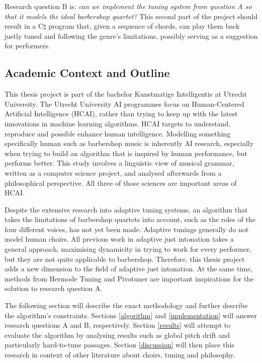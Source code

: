 \documentclass[a4paper]{article}
\begin{document}
Research question B is: {\it can we implement the tuning system from question A so that it models the ideal barbershop quartet?} This second part of the project should result in a C$\sharp$ program that, given a sequence of chords, can play them back justly tuned and following the genre's limitations, possibly serving as a suggestion for performers.

\subsection{Academic Context and Outline}
This thesis project is part of the bachelor Kunstmatige Intelligentie at Utrecht University. The Utrecht University AI programmes focus on Human-Centered Artificial Intelligence (HCAI), rather than trying to keep up with the latest innovations in machine learning algorithms. HCAI targets to understand, reproduce and possible enhance human intelligence.\cite{noauthor_human-centered_2023} Modelling something specifically human such as barbershop music is inherently AI research, especially when trying to build an algorithm that is inspired by human performance, but performs better. This study involves a linguistic view of musical grammar, written as a computer science project, and analysed afterwards from a philosophical perspective. All three of those sciences are important areas of HCAI.

Despite the extensive research into adaptive tuning systems, an algorithm that takes the limitations of barbershop quartets into account, such as the roles of the four different voices, has not yet been made. Adaptive tunings generally do not model human choirs. All previous work in adaptive just intonation takes a general approach, maximising dynamicity in trying to work for every performer, but they are not quite applicable to barbershop. Therefore, this thesis project adds a new dimension to the field of adaptive just intonation. At the same time, methods from Hermode Tuning and Pivotuner are important inspirations for the solution to research question A.

The following section will describe the exact methodology and further describe the algorithm's constraints. Sections \ref{algorithm} and \ref{implementation} will answer research questions A and B, respectively. Section \ref{results} will attempt to evaluate the algorithm by analysing results such as global pitch drift and particularly hard-to-tune passages. Section \ref{discussion} will then place this research in context of other literature about choirs, tuning and philosophy.
\end{document}
